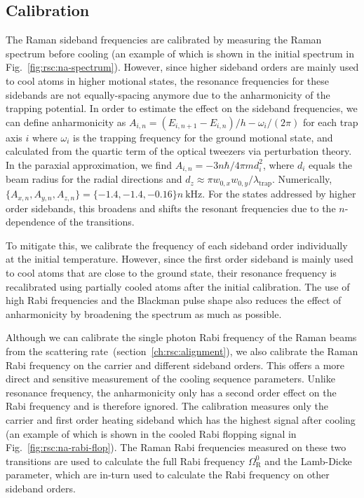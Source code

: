 \subsection{Calibration}
\label{ch:rsc:implementation:calibration}

The Raman sideband frequencies are calibrated by measuring the Raman spectrum before cooling
(an example of which is shown in the initial spectrum in Fig.~\ref{fig:rsc:na-spectrum}).
However, since higher sideband orders are mainly used to cool atoms in higher motional states,
the resonance frequencies for these sidebands are not equally-spacing anymore due to
the anharmonicity of the trapping potential.
In order to estimate the effect on the sideband frequencies,
we can define anharmonicity as $A_{i,n}=(E_{i,n+1}-E_{i,n})/h - \omega_i/(2\pi)$
for each trap axis $i$ where $\omega_i$ is the trapping frequency for the ground motional state,
and calculated from the quartic term of the optical tweezers via perturbation theory.
In the paraxial approximation, we find $A_{i,n}=-3n\hbar/4\pi m d_i^2$,
where $d_i$ equals the beam radius for the radial directions and
$d_z\approx\pi w_{0,x}w_{0,y}/\lambda_{\textrm{trap}}$.
Numerically, $\{A_{x,n},A_{y,n},A_{z,n}\}=\{-1.4, -1.4, -0.16\}n~\mathrm{kHz}$.
For the states addressed by higher order sidebands,
this broadens and shifts the resonant frequencies
due to the $n$-dependence of the transitions.

To mitigate this, we calibrate the frequency of each sideband order individually
at the initial temperature. However, since the first order sideband is mainly used to cool atoms
that are close to the ground state,
their resonance frequency  is recalibrated using partially cooled atoms after the initial calibration.
The use of high Rabi frequencies and the Blackman pulse shape also reduces the effect
of anharmonicity by broadening the spectrum as much as possible.

Although we can calibrate the single photon Rabi frequency of the Raman beams from
the scattering rate~(section~\ref{ch:rsc:alignment}),
we also calibrate the Raman Rabi frequency on the carrier and different sideband orders.
This offers a more direct and sensitive measurement of the cooling sequence parameters.
Unlike resonance frequency, the anharmonicity only has a second order effect on the Rabi frequency
and is therefore ignored. The calibration measures
only the carrier and first order heating sideband which has the highest signal after cooling
(an example of which is shown in the cooled Rabi flopping signal in
Fig.~\ref{fig:rsc:na-rabi-flop}).
The Raman Rabi frequencies measured on these two transitions are used to calculate
the full Rabi frequency $\Omega_{\mathrm{R}}^0$ and the Lamb-Dicke parameter,
which are in-turn used to calculate the Rabi frequency on other sideband orders.

